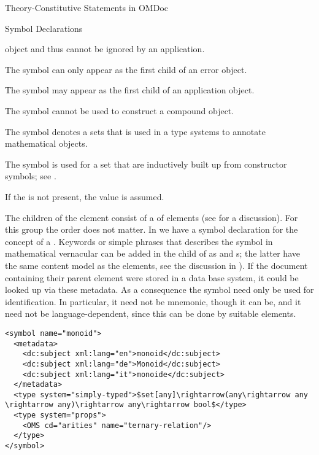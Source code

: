 \begin{omgroup}[short=Mathematical Statements,id=statements]
\begin{omgroup}[id=constitutive-statements]{Theory-Constitutive Statements in OMDoc}
\begin{module}[id=constitutive-statements]
\begin{omgroup}[id=symbol-dec]{Symbol Declarations}
\begin{definition}[id=symbol.def]
\begin{description}
  {\openmath} object and thus cannot be ignored by an application.
\item[\attribute{error}{role}{symbol}] The symbol can only appear as the first child of an
  {\openmath} error object.
\item[\attribute{application}{role}{symbol}] The symbol may appear as the first child of an
  application object.
\item[\attribute{constant}{role}{symbol}] The symbol cannot be used to construct a compound
  object.
\item[\attribute{type}{role}{symbol}] The symbol denotes a sets that is used in a type
  systems to annotate mathematical objects.
\item[\attribute{sort}{role}{symbol}] The symbol is used for a set that are inductively
  built up from constructor symbols; see {}.
\end{description}
If the  is not present, the value
 is assumed.

The children of the  element consist of a
{} of  elements (see {} for
a discussion). For this group the order does not matter.  In {} we have a
symbol declaration for the concept of a {}.  Keywords or simple phrases
that describes the symbol in mathematical vernacular can be added in the
 child of  as  and
{s}; the latter have the same content model as the
 elements, see the discussion in {}). If the document
containing their parent  element were stored in a data base system, it
could be looked up via these metadata. As a consequence the symbol
 need only be used for identification. In particular, it need
not be mnemonic, though it can be, and it need not be language-dependent, since this can
be done by suitable  elements.
\end{definition}

\begin{lstlisting}[label=lst:symbol,mathescape,
  caption={An \omdoc \element{symbol} Declaration},
  index={symbol,type}]
<symbol name="monoid">
  <metadata>
    <dc:subject xml:lang="en">monoid</dc:subject>
    <dc:subject xml:lang="de">Monoid</dc:subject>
    <dc:subject xml:lang="it">monoide</dc:subject>
  </metadata>
  <type system="simply-typed">$set[any]\rightarrow(any\rightarrow any \rightarrow any)\rightarrow any\rightarrow bool$</type>
  <type system="props">
    <OMS cd="arities" name="ternary-relation"/>
  </type>
</symbol>
\end{lstlisting}
\end{omgroup}


\end{module}
\end{omgroup}
\end{omgroup}
